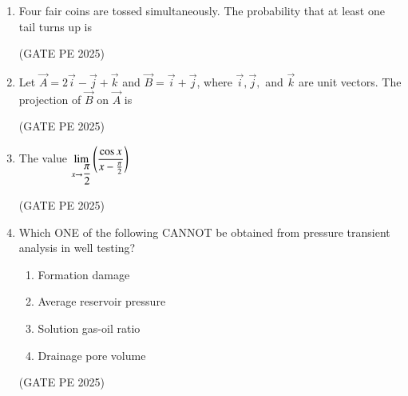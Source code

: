 \documentclass[journal,12pt,onecolumn]{IEEEtran}
\theoremstyle{remark}
\begin{document}
\begin{enumerate}
\item Four fair coins are tossed simultaneously. The probability that at least one tail turns up is
\begin{enumerate}
\end{enumerate}
\hfill{(GATE PE 2025)}

\item Let $\vec{A}=2\vec{i}-\vec{j}+\vec{k}$ and $\vec{B}=\vec{i}+\vec{j}$, where $\vec{i},\vec{j},$ and $\vec{k}$ are unit vectors. The projection of $\vec{B}$ on $\vec{A}$ is
\begin{enumerate}
\end{enumerate}
\hfill{(GATE PE 2025)}

\item The value $\lim\limits_{x \to \dfrac{\pi}{2}}\left(\dfrac{\cos{x}}{x-\frac{\pi}{2}}\right)$
\begin{enumerate}
\end{enumerate}
\hfill{(GATE PE 2025)}


\item Which ONE of the following CANNOT be obtained from pressure transient analysis in well testing?
\begin{enumerate}
    \item Formation damage
    \item Average reservoir pressure
    \item Solution gas-oil ratio
    \item Drainage pore volume
\end{enumerate}
\hfill{(GATE PE 2025)}


\end{enumerate}
\end{document}
